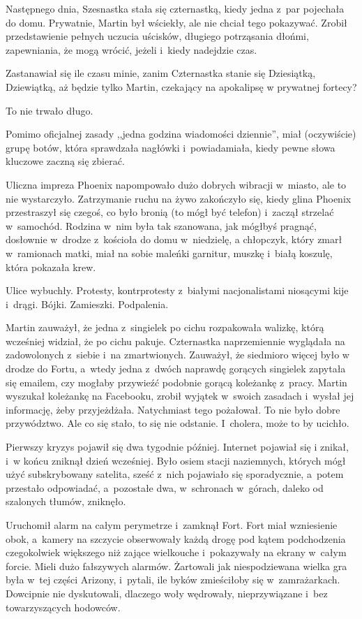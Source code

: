\documentclass[oneside,polish,11pt,sfheadings]{mwbk}
\begin{document}
Następnego dnia, Szesnastka stała się czternastką, kiedy jedna z~par
pojechała do domu. Prywatnie, Martin był wściekły, ale nie chciał tego
pokazywać. Zrobił przedstawienie pełnych uczucia uścisków, długiego
potrząsania dłońmi, zapewniania, że mogą wrócić, jeżeli i~kiedy
nadejdzie czas.

Zastanawiał się ile czasu minie, zanim Czternastka stanie się
Dziesiątką, Dziewiątką, aż będzie tylko Martin, czekający na apokalipsę
w prywatnej fortecy?

To nie trwało długo.

Pomimo oficjalnej zasady ,,jedna godzina wiadomości dziennie'', miał
(oczywiście) grupę botów, która sprawdzała nagłówki i~powiadamiała,
kiedy pewne słowa kluczowe zaczną się zbierać.

Uliczna impreza Phoenix napompowało dużo dobrych wibracji w~miasto, ale
to nie wystarczyło. Zatrzymanie ruchu na żywo zakończyło się, kiedy
glina Phoenix przestraszył się czegoś, co było bronią (to mógł być
telefon) i~zaczął strzelać w~samochód. Rodzina w~nim była tak szanowana,
jak mógłbyś pragnąć, dosłownie w~drodze z~kościoła do domu w~niedzielę,
a chłopczyk, który zmarł w~ramionach matki, miał na sobie maleńki
garnitur, muszkę i~białą koszulę, która pokazała krew.

Ulice wybuchły. Protesty, kontrprotesty z~białymi nacjonalistami
niosącymi kije i~drągi. Bójki. Zamieszki. Podpalenia.

Martin zauważył, że jedna z~singielek po cichu rozpakowała walizkę,
którą wcześniej widział, że po cichu pakuje. Czternastka naprzemiennie
wyglądała na zadowolonych z~siebie i~na zmartwionych. Zauważył, że
siedmioro więcej było w drodze do Fortu, a~wtedy jedna z~dwóch naprawdę
gorących singielek zapytała się emailem, czy mogłaby przywieźć podobnie
gorącą koleżankę z~pracy. Martin wyszukał koleżankę na Facebooku, zrobił
wyjątek w~swoich zasadach i~wysłał jej informację, żeby przyjeżdżała.
Natychmiast tego pożałował. To nie było dobre przywództwo. Ale co się
stało, to się nie odstanie. I~cholera, może to by ucichło.

Pierwszy kryzys pojawił się dwa tygodnie później. Internet pojawiał się
i znikał, i~w końcu zniknął dzień wcześniej. Było osiem stacji
naziemnych, których mógł użyć subskrybowany satelita, sześć z~nich
pojawiało się sporadycznie, a~potem przestało odpowiadać, a~pozostałe
dwa, w~schronach w~górach, daleko od szalonych tłumów, zniknęło.

Uruchomił alarm na całym perymetrze i~zamknął Fort. Fort miał
wzniesienie obok, a~kamery na szczycie obserwowały każdą drogę pod kątem
podchodzenia czegokolwiek większego niż zające wielkouche i~pokazywały
na ekrany w~całym forcie. Mieli dużo fałszywych alarmów. Żartowali jak
niespodziewana wielka gra była w~tej części Arizony, i~pytali, ile byków
zmieściłoby się w~zamrażarkach. Dowcipnie nie dyskutowali, dlaczego woły
wędrowały, nieprzywiązane i~bez towarzyszących hodowców.
\end{document}
